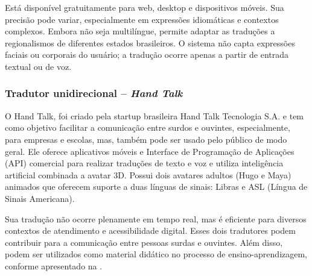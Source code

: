 \documentclass[portuguese]{textolivre}
\begin{document}
Está disponível gratuitamente para web, desktop e dispositivos móveis. Sua precisão pode variar, especialmente em expressões idiomáticas e contextos complexos. Embora não seja multilíngue, permite adaptar as traduções a regionalismos de diferentes estados brasileiros. O sistema não capta expressões faciais ou corporais do usuário; a tradução ocorre apenas a partir de entrada textual ou de voz.

\subsubsection{Tradutor unidirecional – \textit{Hand Talk}}
O Hand Talk, foi criado pela startup brasileira Hand Talk Tecnologia S.A. e tem como objetivo facilitar a comunicação entre surdos e ouvintes, especialmente, para empresas e escolas, mas, também pode ser usado pelo público de modo geral. Ele oferece aplicativos móveis e Interface de Programação de Aplicações (API) comercial para realizar traduções de texto e voz e utiliza inteligência artificial combinada a avatar 3D. Possui dois avatares adultos (Hugo e Maya) animados que oferecem suporte a duas línguas de sinais: Libras e ASL (Língua de Sinais Americana). 

Sua tradução não ocorre plenamente em tempo real, mas é eficiente para diversos contextos de atendimento e acessibilidade digital. Esses dois tradutores podem contribuir para a comunicação entre pessoas surdas e ouvintes. Além disso, podem ser utilizados como material didático no processo de ensino-aprendizagem, conforme apresentado na .
\end{document}
